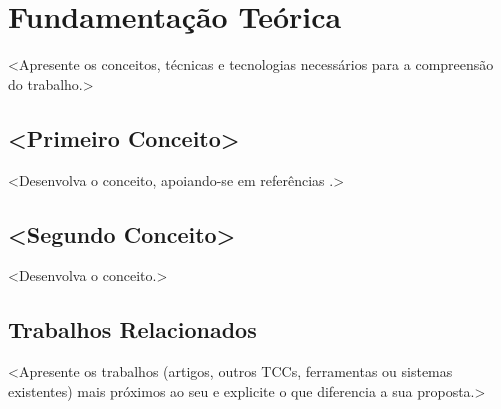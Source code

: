 \chapter[Fundamentação Teórica]{Fundamentação Teórica}\label{ch:fundamentacao}

<Apresente os conceitos, técnicas e tecnologias necessários para a
compreensão do trabalho.>

\section{<Primeiro Conceito>}\label{sec:conceito1}

<Desenvolva o conceito, apoiando-se em referências \cite{exemplo-artigo}.>


\section{<Segundo Conceito>}\label{sec:conceito2}

<Desenvolva o conceito.>


\section{Trabalhos Relacionados}\label{sec:relacionados}

<Apresente os trabalhos (artigos, outros TCCs, ferramentas ou sistemas
existentes) mais próximos ao seu e explicite o que diferencia a sua proposta.>
